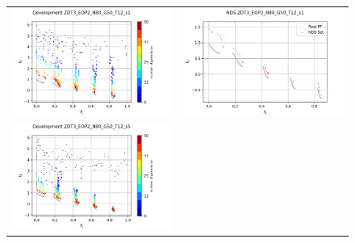 \begin{figure}[H]
    \centering
    \begin{tabular}{c c}
    \includegraphics[scale=0.5]{figures/ZDT3_EOP2_N80_G50_T12/s1_dev.png} &
    \includegraphics[scale=0.5]{figures/ZDT3_EOP2_N80_G50_T12/s1_nds.png}\\
    \includegraphics[scale=0.5]{figures/ZDT3_EOP2_N80_G50_T12/s5_dev.png} &

\end{tabular}
\end{figure}
